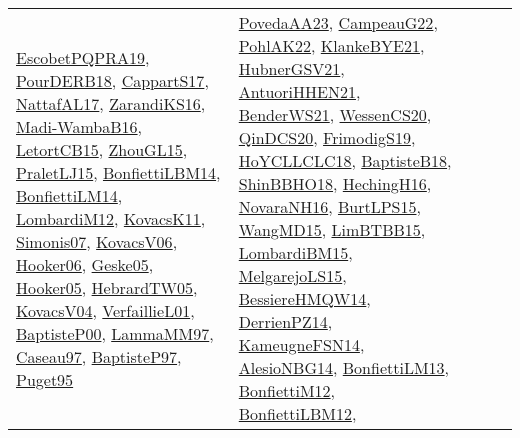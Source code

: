 {\begin{longtable}{lp{3cm}>{\raggedright}p{6cm}>{\raggedright}p{6cm}p{8cm}}
\href{articles/EscobetPQPRA19.pdf}{EscobetPQPRA19}\cite{EscobetPQPRA19}, \href{articles/PourDERB18.pdf}{PourDERB18}\cite{PourDERB18}, \href{papers/CappartS17.pdf}{CappartS17}\cite{CappartS17}, \href{articles/NattafAL17.pdf}{NattafAL17}\cite{NattafAL17}, \href{articles/ZarandiKS16.pdf}{ZarandiKS16}\cite{ZarandiKS16}, \href{papers/Madi-WambaB16.pdf}{Madi-WambaB16}\cite{Madi-WambaB16}, \href{articles/LetortCB15.pdf}{LetortCB15}\cite{LetortCB15}, \href{papers/ZhouGL15.pdf}{ZhouGL15}\cite{ZhouGL15}, \href{papers/PraletLJ15.pdf}{PraletLJ15}\cite{PraletLJ15}, \href{articles/BonfiettiLBM14.pdf}{BonfiettiLBM14}\cite{BonfiettiLBM14}, \href{papers/BonfiettiLM14.pdf}{BonfiettiLM14}\cite{BonfiettiLM14}, \href{articles/LombardiM12.pdf}{LombardiM12}\cite{LombardiM12}, \href{articles/KovacsK11.pdf}{KovacsK11}\cite{KovacsK11}, \href{articles/Simonis07.pdf}{Simonis07}\cite{Simonis07}, \href{papers/KovacsV06.pdf}{KovacsV06}\cite{KovacsV06}, \href{articles/Hooker06.pdf}{Hooker06}\cite{Hooker06}, \href{papers/Geske05.pdf}{Geske05}\cite{Geske05}, \href{articles/Hooker05.pdf}{Hooker05}\cite{Hooker05}, \href{papers/HebrardTW05.pdf}{HebrardTW05}\cite{HebrardTW05}, \href{papers/KovacsV04.pdf}{KovacsV04}\cite{KovacsV04}, \href{papers/VerfaillieL01.pdf}{VerfaillieL01}\cite{VerfaillieL01}, \href{articles/BaptisteP00.pdf}{BaptisteP00}\cite{BaptisteP00}, \href{articles/LammaMM97.pdf}{LammaMM97}\cite{LammaMM97}, \href{papers/Caseau97.pdf}{Caseau97}\cite{Caseau97}, \href{papers/BaptisteP97.pdf}{BaptisteP97}\cite{BaptisteP97}, \href{papers/Puget95.pdf}{Puget95}\cite{Puget95} & \href{papers/PovedaAA23.pdf}{PovedaAA23}\cite{PovedaAA23}, \href{articles/CampeauG22.pdf}{CampeauG22}\cite{CampeauG22}, \href{articles/PohlAK22.pdf}{PohlAK22}\cite{PohlAK22}, \href{papers/KlankeBYE21.pdf}{KlankeBYE21}\cite{KlankeBYE21}, \href{articles/HubnerGSV21.pdf}{HubnerGSV21}\cite{HubnerGSV21}, \href{papers/AntuoriHHEN21.pdf}{AntuoriHHEN21}\cite{AntuoriHHEN21}, \href{papers/BenderWS21.pdf}{BenderWS21}\cite{BenderWS21}, \href{papers/WessenCS20.pdf}{WessenCS20}\cite{WessenCS20}, \href{articles/QinDCS20.pdf}{QinDCS20}\cite{QinDCS20}, \href{papers/FrimodigS19.pdf}{FrimodigS19}\cite{FrimodigS19}, \href{papers/HoYCLLCLC18.pdf}{HoYCLLCLC18}\cite{HoYCLLCLC18}, \href{articles/BaptisteB18.pdf}{BaptisteB18}\cite{BaptisteB18}, \href{articles/ShinBBHO18.pdf}{ShinBBHO18}\cite{ShinBBHO18}, \href{papers/HechingH16.pdf}{HechingH16}\cite{HechingH16}, \href{articles/NovaraNH16.pdf}{NovaraNH16}\cite{NovaraNH16}, \href{papers/BurtLPS15.pdf}{BurtLPS15}\cite{BurtLPS15}, \href{articles/WangMD15.pdf}{WangMD15}\cite{WangMD15}, \href{papers/LimBTBB15.pdf}{LimBTBB15}\cite{LimBTBB15}, \href{papers/LombardiBM15.pdf}{LombardiBM15}\cite{LombardiBM15}, \href{papers/MelgarejoLS15.pdf}{MelgarejoLS15}\cite{MelgarejoLS15}, \href{papers/BessiereHMQW14.pdf}{BessiereHMQW14}\cite{BessiereHMQW14}, \href{papers/DerrienPZ14.pdf}{DerrienPZ14}\cite{DerrienPZ14}, \href{articles/KameugneFSN14.pdf}{KameugneFSN14}\cite{KameugneFSN14}, \href{papers/AlesioNBG14.pdf}{AlesioNBG14}\cite{AlesioNBG14}, \href{papers/BonfiettiLM13.pdf}{BonfiettiLM13}\cite{BonfiettiLM13}, \href{papers/BonfiettiM12.pdf}{BonfiettiM12}\cite{BonfiettiM12}, \href{papers/BonfiettiLBM12.pdf}{BonfiettiLBM12}\cite{BonfiettiLBM12}, 
\end{longtable}}
